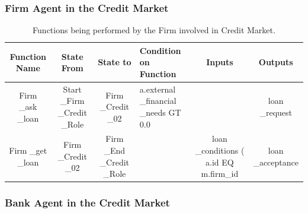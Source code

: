 \subsubsection{Firm Agent in the Credit Market}


\begin{landscape}
\begin{table}[!htb]\caption{Functions being performed by the Firm involved in Credit Market.}
\begin{center}
\begin{tabular}{|c|c|c|l|c|c|}
\hline
Function Name & State From & State to & Condition on Function & Inputs & Outputs \\
\hline {\parbox[l]{3cm}{Firm \_ask \_loan}}& {\parbox[l]{3cm}{Start
\_Firm \_Credit \_Role}}& {\parbox[l]{3cm}{Firm \_Credit \_02}}&
{\parbox[l]{3cm}{a.external \_financial \_needs GT 0.0}} & &loan
\_request
\\
\hline

{\parbox[l]{3cm}{Firm \_get \_loan}}& {\parbox[l]{3cm}{Firm \_Credit
\_02}}& {\parbox[l]{3cm}{Firm \_End \_Credit \_Role}}&
&{\parbox[l]{3cm}{loan \_conditions ( a.id EQ m.firm\_id}} &
{\parbox[l]{3cm}{loan \_acceptance}}\\
\hline


\end{tabular}\end{center}\label{tab:creditbankfn}
\end{table}
\end{landscape}

\subsubsection{Bank Agent in the Credit Market}



